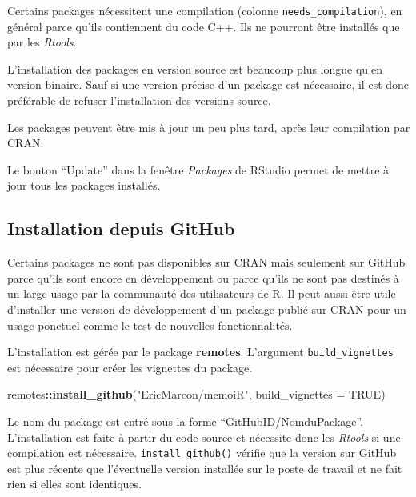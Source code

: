\documentclass[
  12pt,
  french,
  a4paper,
  extrafontsizes,onecolumn,openright
  ]{memoir}
\newenvironment{Shaded}{\begin{snugshade}}{\end{snugshade}}
\newcommand{\DataTypeTok}[1]{\textcolor[rgb]{0.13,0.29,0.53}{#1}}
\newcommand{\KeywordTok}[1]{\textcolor[rgb]{0.13,0.29,0.53}{\textbf{#1}}}
\newcommand{\NormalTok}[1]{#1}
\newcommand{\OperatorTok}[1]{\textcolor[rgb]{0.81,0.36,0.00}{\textbf{#1}}}
\newcommand{\OtherTok}[1]{\textcolor[rgb]{0.56,0.35,0.01}{#1}}
\newcommand{\StringTok}[1]{\textcolor[rgb]{0.31,0.60,0.02}{#1}}
\begin{document}
Certains packages nécessitent une compilation (colonne \texttt{needs\_compilation}), en général parce qu'ils contiennent du code C++.
Ils ne pourront être installés que par les \emph{Rtools}.

L'installation des packages en version source est beaucoup plus longue qu'en version binaire.
Sauf si une version précise d'un package est nécessaire, il est donc préférable de refuser l'installation des versions source.

Les packages peuvent être mis à jour un peu plus tard, après leur compilation par CRAN.

Le bouton \enquote{Update} dans la fenêtre \emph{Packages} de RStudio permet de mettre à jour tous les packages installés.

\hypertarget{installation-depuis-github}{%
\subsection{Installation depuis GitHub}\label{installation-depuis-github}}

Certains packages ne sont pas disponibles sur CRAN mais seulement sur GitHub parce qu'ils sont encore en développement ou parce qu'ils ne sont pas destinés à un large usage par la communauté des utilisateurs de R.
Il peut aussi être utile d'installer une version de développement d'un package publié sur CRAN pour un usage ponctuel comme le test de nouvelles fonctionnalités.

L'installation est gérée par le package \textbf{remotes}.
L'argument \texttt{build\_vignettes} est nécessaire pour créer les vignettes du package.

\scriptsize

\begin{Shaded}
\begin{Highlighting}[]
\NormalTok{remotes}\OperatorTok{::}\KeywordTok{install_github}\NormalTok{(}\StringTok{"EricMarcon/memoiR"}\NormalTok{, }\DataTypeTok{build_vignettes =} \OtherTok{TRUE}\NormalTok{)}
\end{Highlighting}
\end{Shaded}

\normalsize

Le nom du package est entré sous la forme \enquote{GitHubID/NomduPackage}.
L'installation est faite à partir du code source et nécessite donc les \emph{Rtools} si une compilation est nécessaire.
\texttt{install\_github()} vérifie que la version sur GitHub est plus récente que l'éventuelle version installée sur le poste de travail et ne fait rien si elles sont identiques.
\end{document}

